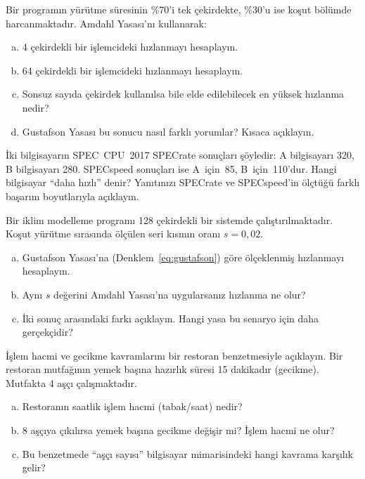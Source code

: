\begin{alistirma}[\orta]
Bir programın yürütme süresinin \%70'i tek çekirdekte, \%30'u ise koşut bölümde harcanmaktadır. Amdahl Yasası'nı kullanarak:
\begin{enumerate}[(a)]
    \item 4 çekirdekli bir işlemcideki hızlanmayı hesaplayın.
    \item 64 çekirdekli bir işlemcideki hızlanmayı hesaplayın.
    \item Sonsuz sayıda çekirdek kullanılsa bile elde edilebilecek en yüksek hızlanma nedir?
    \item Gustafson Yasası bu sonucu nasıl farklı yorumlar? Kısaca açıklayın.
\end{enumerate}
\end{alistirma}

\begin{alistirma}[\orta]
İki bilgisayarın SPEC~CPU~2017 SPECrate sonuçları şöyledir: A bilgisayarı 320, B bilgisayarı 280. SPECspeed sonuçları ise A~için~85, B~için~110'dur. Hangi bilgisayar ``daha hızlı'' denir? Yanıtınızı SPECrate ve SPECspeed'in ölçtüğü farklı başarım boyutlarıyla açıklayın.
\end{alistirma}

\begin{alistirma}[\orta]
Bir iklim modelleme programı 128 çekirdekli bir sistemde çalıştırılmaktadır. Koşut yürütme sırasında ölçülen seri kısmın oranı $s = 0{,}02$.
\begin{enumerate}[(a)]
    \item Gustafson Yasası'na (Denklem~\ref{eq:gustafson}) göre ölçeklenmiş hızlanmayı hesaplayın.
    \item Aynı $s$ değerini Amdahl Yasası'na uygularsanız hızlanma ne olur?
    \item İki sonuç arasındaki farkı açıklayın. Hangi yasa bu senaryo için daha gerçekçidir?
\end{enumerate}
\end{alistirma}


\begin{alistirma}[\kolay]
İşlem hacmi ve gecikme kavramlarını bir restoran benzetmesiyle açıklayın. Bir restoran mutfağının yemek başına hazırlık süresi 15 dakikadır (gecikme). Mutfakta 4 aşçı çalışmaktadır.
\begin{enumerate}[(a)]
    \item Restoranın saatlik işlem hacmi (tabak/saat) nedir?
    \item 8 aşçıya çıkılırsa yemek başına gecikme değişir mi? İşlem hacmi ne olur?
    \item Bu benzetmede ``aşçı sayısı'' bilgisayar mimarisindeki hangi kavrama karşılık gelir?
\end{enumerate}
\end{alistirma}

